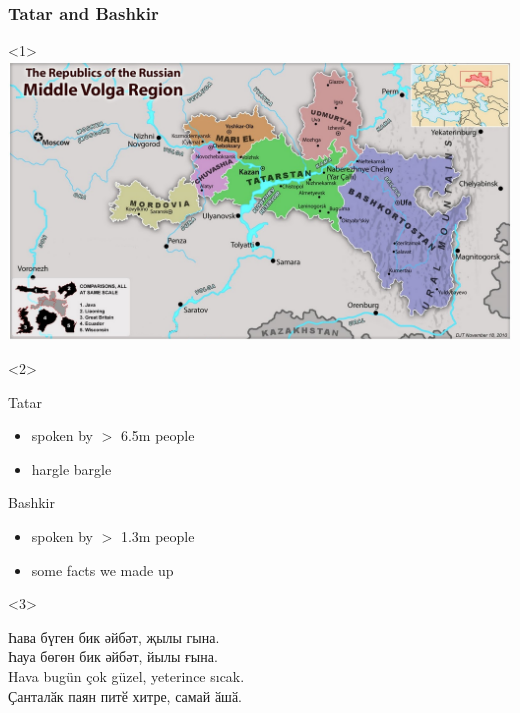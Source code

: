 \documentclass[10pt,xetex]{beamer} %
\begin{document}
\begin{frame}
  \frametitle{Tatar and Bashkir} %

\begin{onlyenv}<1>
\includegraphics[width=\textwidth]{middlevolga19001500.jpg}
\end{onlyenv}
\begin{onlyenv}<2>

\begin{block}{Tatar}

\begin{itemize}
  \item spoken by $>$ 6.5m  people
  \item hargle bargle
\end{itemize}

\end{block}

\begin{block}{Bashkir}

\begin{itemize}
  \item spoken by $>$ 1.3m people
  \item some facts we made up
\end{itemize}


\end{block}

\end{onlyenv}
\begin{onlyenv}<3>

Һава бүген бик әйбәт, җылы гына.  \\
Һауа бөгөн бик әйбәт, йылы ғына. \\

Hava bugün çok güzel, yeterince sıcak. \\
Ҫанталӑк паян питӗ хитре, самай ӑшӑ. \\
\end{onlyenv}

\end{frame}
\end{document}
